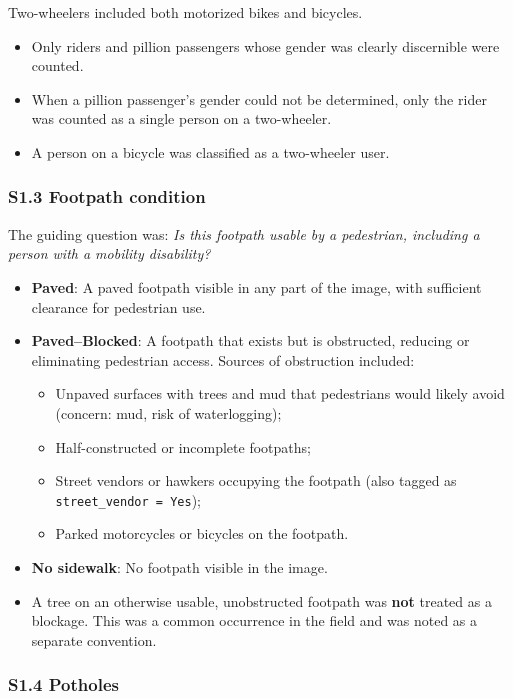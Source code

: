 \documentclass[12pt]{article}
\begin{document}
Two-wheelers included both motorized bikes and bicycles.

\begin{itemize}[nosep]
\item Only riders and pillion passengers whose gender was clearly discernible were counted.
\item When a pillion passenger's gender could not be determined, only the rider was counted as a single person on a two-wheeler.
\item A person on a bicycle was classified as a two-wheeler user.
\end{itemize}

\subsubsection*{S1.3 Footpath condition}

The guiding question was: \textit{Is this footpath usable by a pedestrian, including a person with a mobility disability?}

\begin{itemize}[nosep]
\item \textbf{Paved}: A paved footpath visible in any part of the image, with sufficient clearance for pedestrian use.
\item \textbf{Paved--Blocked}: A footpath that exists but is obstructed, reducing or eliminating pedestrian access. Sources of obstruction included:
  \begin{itemize}[nosep]
  \item Unpaved surfaces with trees and mud that pedestrians would likely avoid (concern: mud, risk of waterlogging);
  \item Half-constructed or incomplete footpaths;
  \item Street vendors or hawkers occupying the footpath (also tagged as \texttt{street\_vendor = Yes});
  \item Parked motorcycles or bicycles on the footpath.
  \end{itemize}
\item \textbf{No sidewalk}: No footpath visible in the image.
\item A tree on an otherwise usable, unobstructed footpath was \textbf{not} treated as a blockage. This was a common occurrence in the field and was noted as a separate convention.
\end{itemize}

\subsubsection*{S1.4 Potholes}
\end{document}
